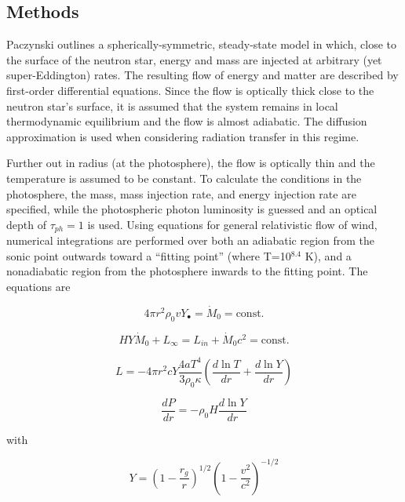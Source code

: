 \documentclass[onecolumn]{aastex63}
\begin{document}
\subsection{Methods}
Paczynski outlines a spherically-symmetric, steady-state model in which, close to the surface of the neutron star, energy and mass are injected at arbitrary (yet super-Eddington) rates. The resulting flow of energy and matter are described by first-order differential equations. Since the flow is optically thick close to the neutron star's surface, it is assumed that the system remains in local thermodynamic equilibrium and the flow is almost adiabatic. The diffusion approximation is used when considering radiation transfer in this regime.

Further out in radius (at the photosphere), the flow is optically thin and the temperature is assumed to be constant. To calculate the conditions in the photosphere, the mass, mass injection rate, and energy injection rate are specified, while the photospheric photon luminosity is guessed and an optical depth of $\tau_{ph} = 1$ is used. Using equations for general relativistic flow of wind, numerical integrations are performed over both an adiabatic region from the sonic point outwards toward a ``fitting point'' (where T=10$^{8.4}$ K), and a nonadiabatic region from the photosphere inwards to the fitting point. The equations are

        \begin{equation}
            4\pi r^2 \rho_0 v Y_\bullet = \dot M_0 = \textrm{const.}
        \end{equation}
        
        \begin{equation}
            HY\dot M_0 + L_\infty = L_{in} + \dot M_0 c^2 = \textrm{const.}
        \end{equation}
        
        \begin{equation} \label{heatdiffusion}
            L = -4\pi r^2 c Y \frac{4aT^4}{3 \rho_0 \kappa} \left(\frac{d \ln{T}}{dr} + \frac{d \ln{Y}}{dr}\right)
        \end{equation}
        
        \begin{equation} \label{eom}
            \frac{dP}{dr} = -\rho_0 H \frac{d \ln{Y}}{dr}
        \end{equation}
        
with

\begin{equation}
    Y = \left(1 - \frac{r_g}{r}\right)^{1/2} \left(1 - \frac{v^2}{c^2}\right)^{-1/2}
\end{equation}
\end{document}
